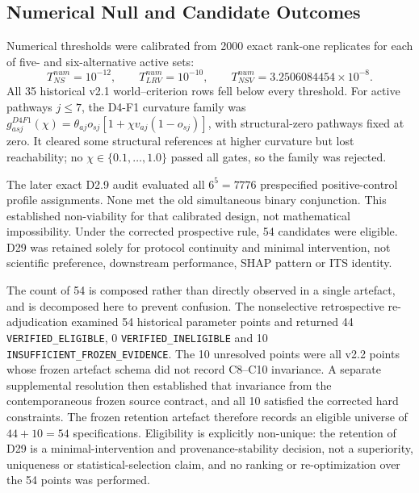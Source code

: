 \documentclass[runningheads,orivec]{llncs}
\begin{document}
\subsection{Numerical Null and Candidate Outcomes}

Numerical thresholds were calibrated from 2000 exact rank-one replicates for each of five- and
six-alternative active sets:
\begin{equation}
T^{num}_{NS}=10^{-12},\qquad
T^{num}_{LRV}=10^{-10},\qquad
T^{num}_{NSV}=3.2506084454\times10^{-8}.
\label{supp:eq:nullthresholds}
\end{equation}
All 35 historical v2.1 world--criterion rows fell below every threshold. For active pathways
\(j\leq7\), the D4-F1 curvature family was
\(g_{asj}^{D4F1}(\chi)=\theta_{aj}o_{sj}[1+\chi v_{aj}(1-o_{sj})]\), with structural-zero
pathways fixed at zero. It cleared some structural references at higher curvature but lost reachability; no
$\chi\in\{0.1,\ldots,1.0\}$ passed all gates, so the family was rejected.

The later exact D2.9 audit evaluated all $6^5=7776$ prespecified positive-control profile
assignments. None met the old simultaneous binary conjunction. This established non-viability
for that calibrated design, not mathematical impossibility. Under the corrected prospective
rule, 54 candidates were eligible. D29 was retained solely for protocol continuity and minimal
intervention, not scientific preference, downstream performance, SHAP pattern or ITS identity.

The count of 54 is composed rather than directly observed in a single artefact, and is
decomposed here to prevent confusion. The nonselective retrospective re-adjudication examined 54
historical parameter points and returned 44 \texttt{VERIFIED\_\allowbreak ELIGIBLE},
0 \texttt{VERIFIED\_\allowbreak INELIGIBLE} and 10
\texttt{INSUFFICIENT\_\allowbreak FROZEN\_\allowbreak EVIDENCE}. The 10
unresolved points were all v2.2 points whose frozen artefact schema did not record C8--C10
invariance. A separate supplemental resolution then established that invariance from the
contemporaneous frozen source contract, and all 10 satisfied the corrected hard constraints.
The frozen retention artefact therefore records an eligible universe of
$44+10=54$ specifications. Eligibility is explicitly non-unique: the retention of D29 is a
minimal-intervention and provenance-stability decision, not a superiority, uniqueness or
statistical-selection claim, and no ranking or re-optimization over the 54 points was
performed.
\end{document}
